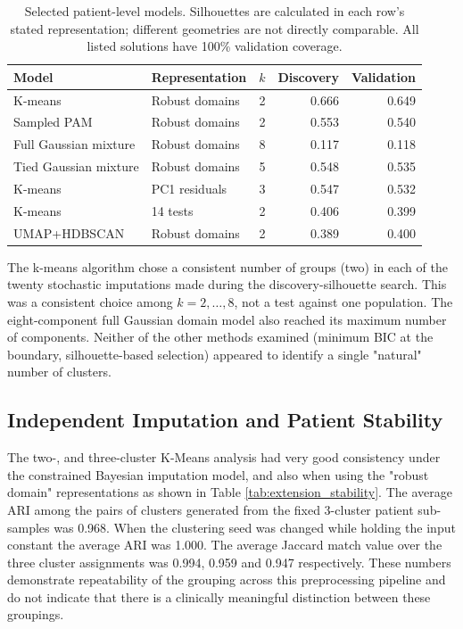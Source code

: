 \begin{table}[htbp]
\centering\small
\caption{Selected patient-level models. Silhouettes are calculated in each row's stated representation; different geometries are not directly comparable. All listed solutions have 100\% validation coverage.}
\label{tab:extension_benchmarks}
\begin{tabular}{p{}p{}rrr}
\toprule
Model & Representation & $k$ & Discovery & Validation \\
\midrule
K-means & Robust domains & 2 & 0.666 & 0.649 \\
Sampled PAM & Robust domains & 2 & 0.553 & 0.540 \\
Full Gaussian mixture & Robust domains & 8 & 0.117 & 0.118 \\
Tied Gaussian mixture & Robust domains & 5 & 0.548 & 0.535 \\
K-means & PC1 residuals & 3 & 0.547 & 0.532 \\
K-means & 14 tests & 2 & 0.406 & 0.399 \\
UMAP+HDBSCAN & Robust domains & 2 & 0.389 & 0.400 \\
\bottomrule
\end{tabular}
\end{table}

The k-means algorithm chose a consistent number of groups (two) in each of the twenty stochastic imputations made during the discovery-silhouette search. This was a consistent choice among $k=2,\ldots,8$, not a test against one population. The eight-component full Gaussian domain model also reached its maximum number of components. Neither of the other methods examined (minimum BIC at the boundary, silhouette-based selection) appeared to identify a single "natural" number of clusters.

\subsection{Independent Imputation and Patient Stability}

The two-, and three-cluster K-Means analysis had very good consistency under the constrained Bayesian imputation model, and also when using the "robust domain" representations as shown in Table \ref{tab:extension_stability}. The average ARI among the pairs of clusters generated from the fixed 3-cluster patient sub-samples was 0.968. When the clustering seed was changed while holding the input constant the average ARI was 1.000. The average Jaccard match value over the three cluster assignments was 0.994, 0.959 and 0.947 respectively. These numbers demonstrate repeatability of the grouping across this preprocessing pipeline and do not indicate that there is a clinically meaningful distinction between these groupings.

